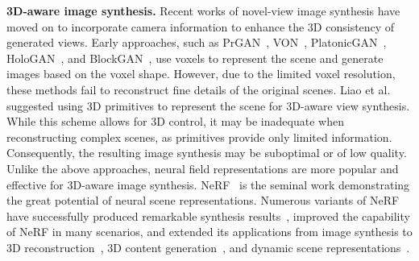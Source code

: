 {\bf 3D-aware image synthesis.}
Recent works of novel-view image synthesis have moved on to incorporate camera information to enhance the 3D consistency of generated views. 
Early approaches, such as PrGAN~\cite{PrGAN}, VON~\cite{VON}, PlatonicGAN~\cite{PlatonicGAN}, HoloGAN~\cite{HoloGAN}, and BlockGAN~\cite{BlockGAN}, use voxels to represent the scene and generate images based on the voxel shape. 
However, due to the limited voxel resolution, these methods fail to reconstruct fine details of the original scenes. 
Liao et al.\ \cite{ControllableGAN} suggested using 3D primitives to represent the scene for 3D-aware view synthesis. 
While this scheme allows for 3D control, it may be inadequate when reconstructing complex scenes, as primitives provide only limited information.
Consequently, the resulting image synthesis may be suboptimal or of low quality.
%
Unlike the above approaches, neural field representations are more popular and effective for 3D-aware image synthesis. 
NeRF~\cite{Mildenhall-NeRF-ECCV20} is the seminal work demonstrating the great potential of neural scene representations. 
Numerous variants of NeRF have successfully produced remarkable synthesis results~\cite{Schwarz-GRAF-NeurIPS20,Yu-pixelNeRF-CVPR21,Chan-PiGAN-CVPR21,Jain-DietNeRF-ICCV21,Mildenhall-RawNeRF-CVPR22,Gu-StyleNeRF-ICLR22}, improved the capability of NeRF in many scenarios, and extended its applications from image synthesis to 3D reconstruction~\cite{Oechsle-UNISURF-ICCV21,Wang-NeuS-NeurIPS21,Yariv-VolSDF-NeurIPS21}, 3D content generation~\cite{Niemeyer-GIRAFFE-CVPR21, Jain-DreamField-CVPR22, Wang-CLIP-NeRF-CVPR22, Chan-EG3D-CVPR22}, and dynamic scene representations~\cite{Park-Nerfies-ICCV21, Pumarola-D-NeRF-CVPR21, Singer-Text-To-4D-arXiv23, Cao-HexPlane-CVPR23}.

